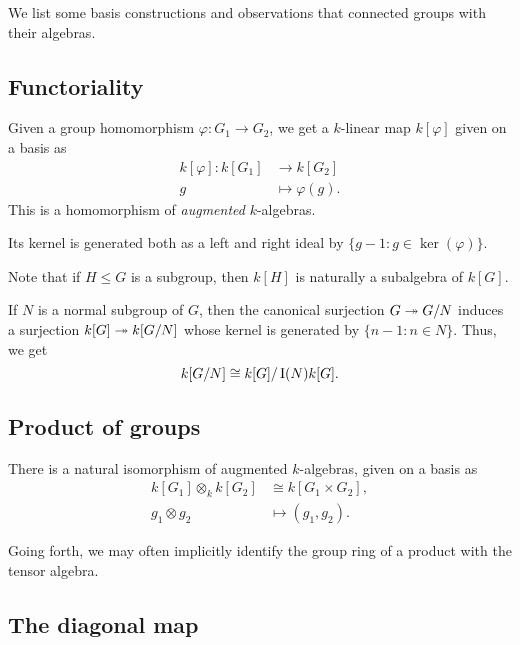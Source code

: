 \documentclass[12pt]{article}
\begin{document}
We list some basis constructions and observations that connected groups with their algebras.

\subsection{Functoriality}

Given a group homomorphism $\varphi \colon G_{1} \to G_{2}$, 
we get a $k$-linear map $k[\varphi]$ given on a basis as
\begin{align*} 
	k[\varphi] \colon k[G_{1}] & \to k[G_{2}] \\
	g & \mapsto \varphi(g).
\end{align*}
This is a homomorphism of \emph{augmented} $k$-algebras.

\begin{lem}
	Its kernel is generated both as a left and right ideal by $\{g - 1 : g \in \ker(\varphi)\}$.
\end{lem}

Note that if $H \le G$ is a subgroup, then $k[H]$ is naturally a subalgebra of $k[G]$.

\begin{thm}
	If $N$ is a normal subgroup of $G$, then the canonical surjection $G \twoheadrightarrow G/N$ induces
	a surjection $k[G] \twoheadrightarrow k[G/N]$ whose kernel is generated by $\{n - 1 : n \in N\}$. 
	Thus, we get
	\begin{equation*} 
		k[G/N] \cong k[G]/\operatorname{I}(N)k[G].
	\end{equation*}
\end{thm}

\subsection{Product of groups}

There is a natural isomorphism of augmented $k$-algebras, given on a basis as
\begin{align*} 
	k[G_{1}] \otimes_{k} k[G_{2}] &\cong k[G_{1} \times G_{2}], \\
	g_{1} \otimes g_{2} &\mapsto (g_{1}, g_{2}).
\end{align*}

Going forth, we may often implicitly identify the group ring of a product with the tensor algebra.

\subsection{The diagonal map}
\end{document}
